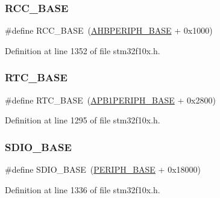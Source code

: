 \subsubsection{\texorpdfstring{R\+C\+C\+\_\+\+B\+A\+SE}{RCC\_BASE}}
{\footnotesize\ttfamily \#define R\+C\+C\+\_\+\+B\+A\+SE~(\hyperlink{group___peripheral__memory__map_ga92eb5d49730765d2abd0f5b09548f9f5}{A\+H\+B\+P\+E\+R\+I\+P\+H\+\_\+\+B\+A\+SE} + 0x1000)}



Definition at line 1352 of file stm32f10x.\+h.

\mbox{\label{group___peripheral__memory__map_ga4265e665d56225412e57a61d87417022}} 
\subsubsection{\texorpdfstring{R\+T\+C\+\_\+\+B\+A\+SE}{RTC\_BASE}}
{\footnotesize\ttfamily \#define R\+T\+C\+\_\+\+B\+A\+SE~(\hyperlink{group___peripheral__memory__map_ga45666d911f39addd4c8c0a0ac3388cfb}{A\+P\+B1\+P\+E\+R\+I\+P\+H\+\_\+\+B\+A\+SE} + 0x2800)}



Definition at line 1295 of file stm32f10x.\+h.

\mbox{\label{group___peripheral__memory__map_ga95dd0abbc6767893b4b02935fa846f52}} 
\subsubsection{\texorpdfstring{S\+D\+I\+O\+\_\+\+B\+A\+SE}{SDIO\_BASE}}
{\footnotesize\ttfamily \#define S\+D\+I\+O\+\_\+\+B\+A\+SE~(\hyperlink{group___peripheral__memory__map_ga9171f49478fa86d932f89e78e73b88b0}{P\+E\+R\+I\+P\+H\+\_\+\+B\+A\+SE} + 0x18000)}



Definition at line 1336 of file stm32f10x.\+h.

